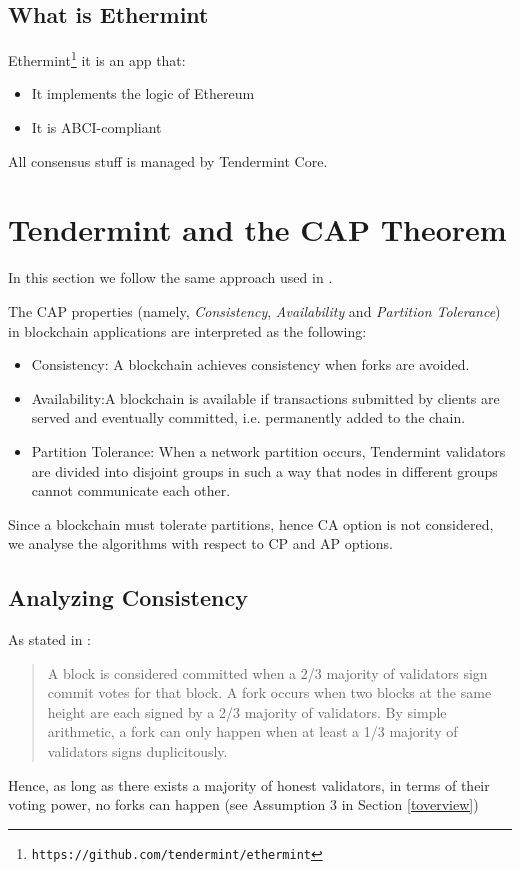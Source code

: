 \documentclass[]{article}
\begin{document}
\subsection{What is Ethermint}
Ethermint\footnote{\texttt{https://github.com/tendermint/ethermint}} it is an app that:
\begin{itemize}
	\item It implements the logic of Ethereum
	\item It is ABCI-compliant
\end{itemize}
All consensus stuff is managed by Tendermint Core.

\section{Tendermint and the CAP Theorem}
\label{tcap}
In this section we follow the same approach used in \cite{poa-vs-pbft}.

The CAP properties (namely, \textit{Consistency}, \textit{Availability} and \textit{Partition Tolerance}) in blockchain applications are interpreted as the following:
\begin{itemize}
\item Consistency: A blockchain achieves consistency when forks are avoided.
\item Availability:A blockchain is available if transactions submitted by clients are served and eventually committed, i.e. permanently added to the chain.
\item Partition Tolerance: When a network partition occurs, Tendermint validators are divided into disjoint groups in such a way that nodes in different groups cannot communicate each other.
\end{itemize}
Since a blockchain must tolerate partitions, hence CA option is not considered, we analyse the algorithms with respect to CP and AP options.

\subsection{Analyzing Consistency}
As stated in \cite{tpaper}:
\blockquote{
A block is considered committed when a 2/3 majority of validators sign commit votes for that block. A fork occurs when two blocks at the same height are each signed by a 2/3 majority of validators. By simple arithmetic, a fork can only happen when at least a 1/3 majority of validators signs duplicitously.}
Hence, as long as there exists a majority of honest validators, in terms of their voting power, no forks can happen (see Assumption 3 in Section \ref{toverview})
\end{document}
